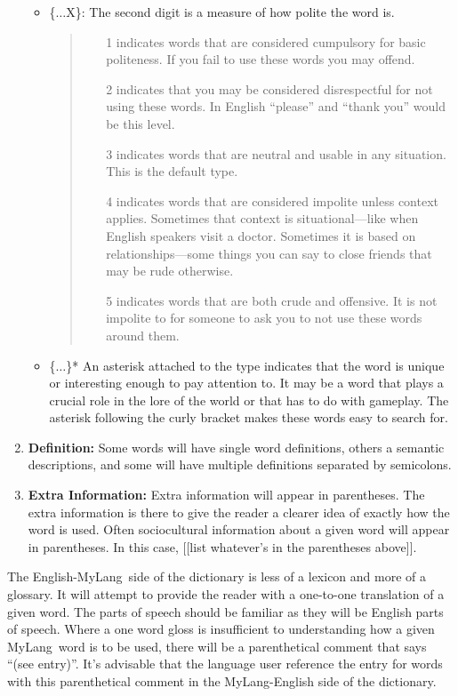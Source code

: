 \documentclass[oneside]{book}
\newcommand{\LanguageName}{MyLang}
\begin{document}
\begin{enumerate}
\begin{itemize}
\begin{quote}
\begin{enumerate}
\end{enumerate}
\end{quote}
\item
\{$\ldots$X\}:
The second digit is a measure of how polite the word is.
\begin{quote}
\begin{enumerate}
\item[1] indicates words that are considered cumpulsory for basic politeness.
If you fail to use these words you may offend.
\item[2] indicates that you may be considered disrespectful for not using these words.
In English ``please'' and ``thank you'' would be this level.
\item[3] indicates words that are neutral and usable in any situation.
This is the default type.
\item[4] indicates words that are considered impolite unless context applies.
Sometimes that context is situational---like when English speakers visit a doctor.
Sometimes it is based on relationships---some things you can say to close friends that may be rude otherwise.
\item[5] indicates words that are both crude and offensive.
It is not impolite to for someone to ask you to not use these words around them.
\end{enumerate}
\end{quote}
\item
\{$\ldots$\}*
An asterisk attached to the type indicates that the word is unique or interesting enough to pay attention to.
It may be a word that plays a crucial role in the lore of the world or that has to do with gameplay.
The asterisk following the curly bracket makes these words easy to search for.
\end{itemize}
\item
\textbf{Definition:}
Some words will have single word definitions, others a semantic descriptions, and some will have multiple definitions separated by semicolons.
\item
\textbf{Extra Information:}
Extra information will appear in parentheses.
The extra information is there to give the reader a clearer idea of exactly how the word is used.
Often sociocultural information about a given word will appear in parentheses.
In this case, [[list whatever's in the parentheses above]].
\end{enumerate}

The English-\LanguageName\ side of the dictionary is less of a lexicon and more of a glossary.
It will attempt to provide the reader with a one-to-one translation of a given word.
The parts of speech should be familiar as they will be English parts of speech.
Where a one word gloss is insufficient to understanding how a given \LanguageName\ word is to be used, there will be a parenthetical comment that says ``(see entry)''.
It's advisable that the language user reference the entry for words with this parenthetical comment in the \LanguageName-English side of the dictionary.
\end{document}
